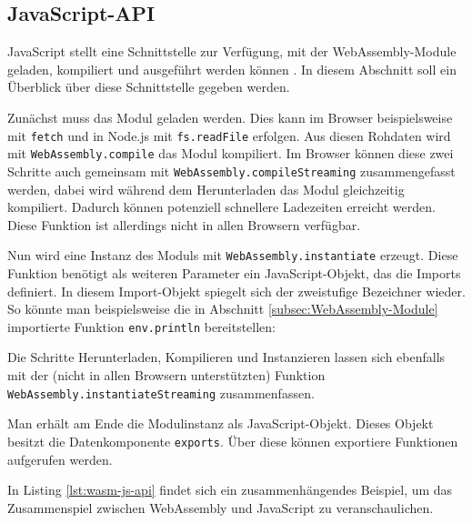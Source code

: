 \subsection{JavaScript-API}
\label{subsec:WebAssembly-JavaScript-API}
JavaScript stellt eine Schnittstelle zur Verfügung, mit der WebAssembly-Module geladen, kompiliert und ausgeführt werden können \cite{MDNWebAssembly}. In diesem Abschnitt soll ein Überblick über diese Schnittstelle gegeben werden.

Zunächst muss das Modul geladen werden. Dies kann im Browser beispielsweise mit \lstinline{fetch} und in Node.js mit \lstinline{fs.readFile} erfolgen. Aus diesen Rohdaten wird mit \lstinline{WebAssembly.compile} das Modul kompiliert. Im Browser können diese zwei Schritte auch gemeinsam mit \lstinline{WebAssembly.compileStreaming} zusammengefasst werden, dabei wird während dem Herunterladen das Modul gleichzeitig kompiliert. Dadurch können potenziell schnellere Ladezeiten erreicht werden. Diese Funktion ist allerdings nicht in allen Browsern verfügbar.

Nun wird eine Instanz des Moduls mit \lstinline{WebAssembly.instantiate} erzeugt. Diese Funktion benötigt als weiteren Parameter ein JavaScript-Objekt, das die Imports definiert. In diesem Import-Objekt spiegelt sich der zweistufige Bezeichner wieder. So könnte man beispielsweise die in Abschnitt \ref{subsec:WebAssembly-Module} importierte Funktion \lstinline{env.println} bereitstellen:



Die Schritte Herunterladen, Kompilieren und Instanzieren lassen sich ebenfalls mit der (nicht in allen Browsern unterstützten) Funktion \lstinline{WebAssembly.instantiateStreaming} zusammenfassen.

Man erhält am Ende die Modulinstanz als JavaScript-Objekt. Dieses Objekt besitzt die Datenkomponente \lstinline{exports}. Über diese können exportiere Funktionen aufgerufen werden.

In Listing \ref{lst:wasm-js-api} findet sich ein zusammenhängendes Beispiel, um das Zusammenspiel zwischen WebAssembly und JavaScript zu veranschaulichen.



